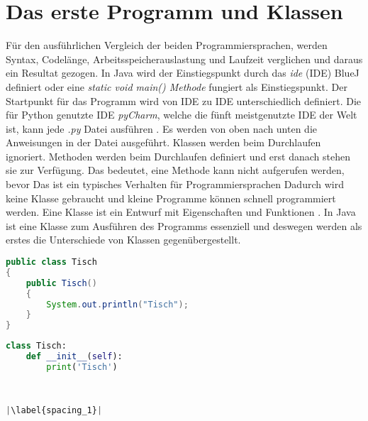 \section{Das erste Programm und Klassen}
Für den ausführlichen Vergleich der beiden Programmiersprachen, werden Syntax, Codelänge, Arbeitsspeicherauslastung und Laufzeit verglichen und daraus ein Resultat gezogen.
In Java wird der Einstiegspunkt durch das \textit{\acrlong{ide}} (IDE) BlueJ definiert oder eine \textit{static void main() Methode} fungiert als Einstiegspunkt. 
Der Startpunkt für das Programm wird von IDE zu IDE unterschiedlich definiert. 
Die für Python genutzte IDE \textit{pyCharm}, welche die fünft meistgenutzte IDE der Welt ist, kann jede \textit{.py} Datei ausführen \cite{Github:IDE}\cite{PyCharm}.
Es werden von oben nach unten die Anweisungen in der Datei ausgeführt.
Klassen werden beim Durchlaufen ignoriert.
Methoden werden beim Durchlaufen definiert und erst danach stehen sie zur Verfügung.
Das bedeutet, eine Methode kann nicht aufgerufen werden, bevor 
Das ist ein typisches Verhalten für Programmiersprachen
Dadurch wird keine Klasse gebraucht und kleine Programme können schnell programmiert werden. 
Eine Klasse ist ein Entwurf mit Eigenschaften und Funktionen \cite{gfg}. 
In Java ist eine Klasse zum Ausführen des Programms essenziell und deswegen werden als erstes die Unterschiede von Klassen gegenübergestellt.

\begin{minipage}{.5\linewidth}
\begin{lstlisting}[language=java,caption={Klasse in Java},captionpos=b,label={lst:java:class},frame=none]
public class Tisch
{
    public Tisch()
    {
        System.out.println("Tisch");
    }
}
\end{lstlisting}
\end{minipage}
\begin{minipage}{.5\linewidth}
\begin{lstlisting}[language=python,caption={Klasse in Python},captionpos=b,label={lst:python:class},frame=l,escapechar=|]
class Tisch:
    def __init__(self):
        print('Tisch')
        
        

|\label{spacing_1}|
\end{lstlisting}
\end{minipage}

